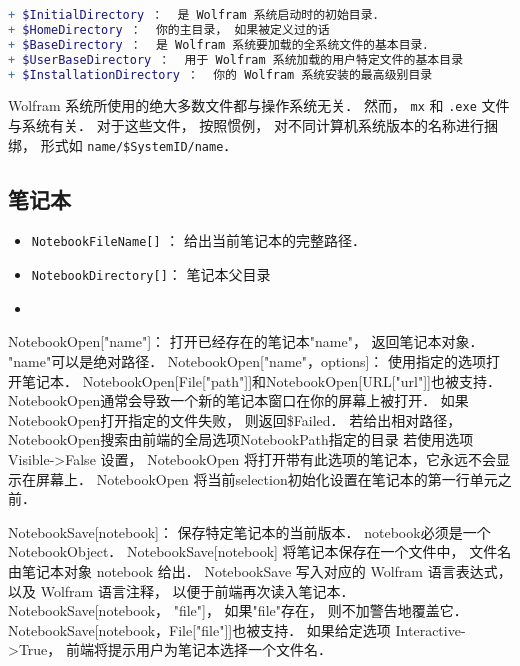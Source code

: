\begin{lstlisting}[language=mathematica]
+ $InitialDirectory ：  是 Wolfram 系统启动时的初始目录．
+ $HomeDirectory ：  你的主目录， 如果被定义过的话
+ $BaseDirectory ：  是 Wolfram 系统要加载的全系统文件的基本目录．
+ $UserBaseDirectory ：  用于 Wolfram 系统加载的用户特定文件的基本目录
+ $InstallationDirectory ：  你的 Wolfram 系统安装的最高级别目录
\end{lstlisting}

Wolfram 系统所使用的绝大多数文件都与操作系统无关． 然而， \verb`mx` 和 \verb`.exe` 文件与系统有关．
对于这些文件， 按照惯例， 对不同计算机系统版本的名称进行捆绑， 形式如 \verb`name/$SystemID/name`．

\subsection{笔记本}

\begin{itemize}
\item \verb`NotebookFileName[]` ： 给出当前笔记本的完整路径．
\item \verb`NotebookDirectory[]`： 笔记本父目录
\end{itemize}


\begin{itemize}
\item

\end{itemize}

NotebookOpen["name"]：  打开已经存在的笔记本"name"， 返回笔记本对象． "name"可以是绝对路径．
NotebookOpen["name"，options]： 使用指定的选项打开笔记本．
NotebookOpen[File["path"]]和NotebookOpen[URL["url"]]也被支持．
NotebookOpen通常会导致一个新的笔记本窗口在你的屏幕上被打开．
如果NotebookOpen打开指定的文件失败， 则返回\$Failed．
若给出相对路径， NotebookOpen搜索由前端的全局选项NotebookPath指定的目录
若使用选项 Visible->False 设置， NotebookOpen 将打开带有此选项的笔记本，它永远不会显示在屏幕上．
NotebookOpen 将当前selection初始化设置在笔记本的第一行单元之前．

NotebookSave[notebook]： 保存特定笔记本的当前版本．
    notebook必须是一个NotebookObject．
    NotebookSave[notebook] 将笔记本保存在一个文件中， 文件名由笔记本对象 notebook 给出．
    NotebookSave 写入对应的 Wolfram 语言表达式， 以及 Wolfram 语言注释， 以便于前端再次读入笔记本．
    NotebookSave[notebook， "file"]， 如果"file"存在， 则不加警告地覆盖它．
    NotebookSave[notebook，File["file"]]也被支持．
    如果给定选项 Interactive->True， 前端将提示用户为笔记本选择一个文件名．

